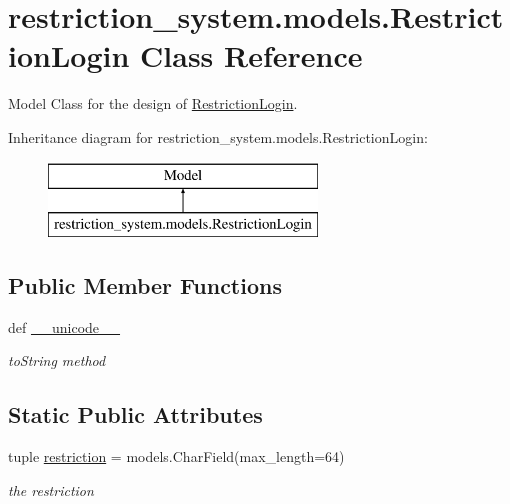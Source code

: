 \hypertarget{classrestriction__system_1_1models_1_1RestrictionLogin}{}\section{restriction\+\_\+system.\+models.\+Restriction\+Login Class Reference}
\label{classrestriction__system_1_1models_1_1RestrictionLogin}


Model Class for the design of \hyperlink{classrestriction__system_1_1models_1_1RestrictionLogin}{Restriction\+Login}.  


Inheritance diagram for restriction\+\_\+system.\+models.\+Restriction\+Login\+:\begin{figure}[H]
\begin{center}
\leavevmode
\includegraphics[height=2.000000cm]{classrestriction__system_1_1models_1_1RestrictionLogin}
\end{center}
\end{figure}
\subsection*{Public Member Functions}
\begin{DoxyCompactItemize}
\item 
def \hyperlink{classrestriction__system_1_1models_1_1RestrictionLogin_a5bdcc0354b1a97490fc032075b53f534}{\+\_\+\+\_\+unicode\+\_\+\+\_\+}
\begin{DoxyCompactList}\small\item\em to\+String method \end{DoxyCompactList}\end{DoxyCompactItemize}
\subsection*{Static Public Attributes}
\begin{DoxyCompactItemize}
\item 
\hypertarget{classrestriction__system_1_1models_1_1RestrictionLogin_ae41acc968daa6351975a70735121abec}{}tuple \hyperlink{classrestriction__system_1_1models_1_1RestrictionLogin_ae41acc968daa6351975a70735121abec}{restriction} = models.\+Char\+Field(max\+\_\+length=64)\label{classrestriction__system_1_1models_1_1RestrictionLogin_ae41acc968daa6351975a70735121abec}

\begin{DoxyCompactList}\small\item\em the restriction \end{DoxyCompactList}\end{DoxyCompactItemize}


